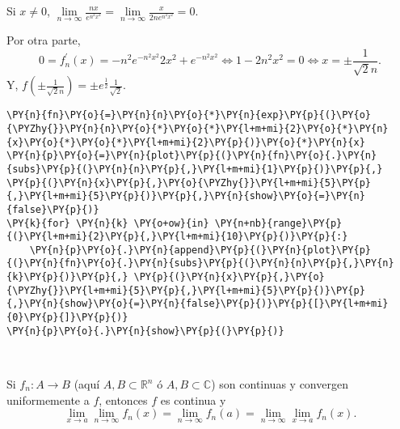 \begin{ejemplo}{}
\begin{enumerate}
Si $x\neq 0$, $\lim\limits_{n\to \infty} \frac{nx}{e^{n^2x^2}}=\lim\limits_{n \to \infty} \frac{x}{2ne^{n^2x^2}}=0$.

Por otra parte, 
\[
0=f^{'}_n(x)=-n^2e^{-n^2 x^2}2x^2+e^{-n^2x^2}\Leftrightarrow 1-2n^2x^2=0 \Leftrightarrow x=\pm \frac{1}{\sqrt{2}n}.
\]
Y, $f\left(\pm\frac{1}{\sqrt{2}n}\right)=\pm e^{\frac{1}{2}}\frac{1}{\sqrt{2}}$.

    \begin{tcolorbox}[breakable, size=fbox, boxrule=1pt, pad at break*=1mm,colback=cellbackground, colframe=cellborder]
\begin{Verbatim}[commandchars=\\\{\}]
\PY{n}{fn}\PY{o}{=}\PY{n}{n}\PY{o}{*}\PY{n}{exp}\PY{p}{(}\PY{o}{\PYZhy{}}\PY{n}{n}\PY{o}{*}\PY{o}{*}\PY{l+m+mi}{2}\PY{o}{*}\PY{n}{x}\PY{o}{*}\PY{o}{*}\PY{l+m+mi}{2}\PY{p}{)}\PY{o}{*}\PY{n}{x}
\PY{n}{p}\PY{o}{=}\PY{n}{plot}\PY{p}{(}\PY{n}{fn}\PY{o}{.}\PY{n}{subs}\PY{p}{(}\PY{n}{n}\PY{p}{,}\PY{l+m+mi}{1}\PY{p}{)}\PY{p}{,} \PY{p}{(}\PY{n}{x}\PY{p}{,}\PY{o}{\PYZhy{}}\PY{l+m+mi}{5}\PY{p}{,}\PY{l+m+mi}{5}\PY{p}{)}\PY{p}{,}\PY{n}{show}\PY{o}{=}\PY{n}{false}\PY{p}{)}
\PY{k}{for} \PY{n}{k} \PY{o+ow}{in} \PY{n+nb}{range}\PY{p}{(}\PY{l+m+mi}{2}\PY{p}{,}\PY{l+m+mi}{10}\PY{p}{)}\PY{p}{:}
    \PY{n}{p}\PY{o}{.}\PY{n}{append}\PY{p}{(}\PY{n}{plot}\PY{p}{(}\PY{n}{fn}\PY{o}{.}\PY{n}{subs}\PY{p}{(}\PY{n}{n}\PY{p}{,}\PY{n}{k}\PY{p}{)}\PY{p}{,} \PY{p}{(}\PY{n}{x}\PY{p}{,}\PY{o}{\PYZhy{}}\PY{l+m+mi}{5}\PY{p}{,}\PY{l+m+mi}{5}\PY{p}{)}\PY{p}{,}\PY{n}{show}\PY{o}{=}\PY{n}{false}\PY{p}{)}\PY{p}{[}\PY{l+m+mi}{0}\PY{p}{]}\PY{p}{)}
\PY{n}{p}\PY{o}{.}\PY{n}{show}\PY{p}{(}\PY{p}{)}
\end{Verbatim}
\end{tcolorbox}

    \begin{center}
    \end{center}
    { \hspace*{\fill} \\}
\end{enumerate}
\end{ejemplo}


\begin{teorema}{}
Si $f_n: A\to B$ (aquí $A,B \subset \mathbb{R}^n$ ó $A,B \subset \mathbb{C}$) 
son continuas y convergen uniformemente a $f$, entonces $f$ es continua y 
\[
\lim\limits_{x \to a}\lim\limits_{n \to \infty} f_n(x)=
\lim\limits_{n \to \infty} f_n(a)=
\lim\limits_{n \to \infty} \lim \limits_{x \to a} f_n(x).
\]
\end{teorema}

